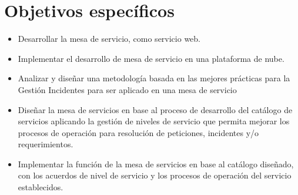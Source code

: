 \section{Objetivos específicos}\label{cap:objEspec}
\begin{itemize}
	

\item Desarrollar la mesa de servicio, como servicio web.

\item Implementar el desarrollo de mesa de servicio en una plataforma de nube.
\item  Analizar y diseñar una metodología basada en las mejores prácticas para la Gestión 
Incidentes para ser aplicado en una mesa de servicio


\item Diseñar la mesa de servicios en base al proceso de desarrollo del catálogo de servicios  aplicando la gestión de niveles de servicio que permita mejorar los procesos de operación para  resolución de peticiones, incidentes y/o requerimientos.

\item Implementar la función de la mesa de servicios en base al catálogo diseñado, con los acuerdos 
de nivel de servicio y los procesos de operación del servicio establecidos.
\end{itemize}



